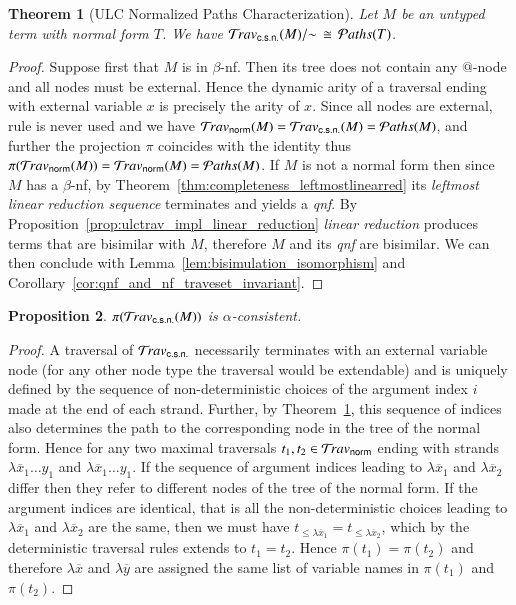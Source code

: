 \documentclass{elsarticle}
\theoremstyle{plain}
\newtheorem{theorem}{Theorem}[section]
\newtheorem{proposition}[theorem]{Proposition}
\theoremstyle{definition}
\newcommand{\normalizing}{{\sf norm}}
\newcommand{\travsetnorm}{\travset_\normalizing} %
\newcommand{\travsetscn}{\travset_{\sf c.s.n.}} %
\def\structisomorphic{\cong} %
\def\coresymbol{\pi} %
\newcommand{\core}[1]{\coresymbol(#1)} %
\newcommand\pathset{{\mathcal{P}aths}} %
\begin{document}
\begin{theorem}[ULC Normalized Paths Characterization]
\label{thm:path_charact_ulc}
Let $M$ be an untyped term with normal form $T$. We have
$\travsetscn(M)/{\sim} \, \structisomorphic\, \pathset(T)$.
\end{theorem}
\begin{proof}
Suppose first that $M$ is in $\beta$-nf. Then its tree does not contain any $@$-node and all nodes must be external.
Hence the dynamic arity of a traversal ending with external variable $x$ is precisely the arity of $x$. Since all nodes are external,
rule  is never used and we have
$\travsetnorm(M) = \travsetscn(M) = \pathset(M)$, and further
the projection $\coresymbol$ coincides with the identity thus $\core{\travsetnorm(M)} = \travsetnorm(M) = \pathset(M)$.
%
If $M$ is not a normal form then since $M$ has a $\beta$-nf, by Theorem~\ref{thm:completeness_leftmostlinearred} its \emph{leftmost linear reduction sequence} terminates and yields a \emph{qnf}.
By Proposition~\ref{prop:ulctrav_impl_linear_reduction}
\emph{linear reduction} produces terms that are bisimilar with $M$,
therefore $M$ and its \emph{qnf} are bisimilar.
We can then conclude with Lemma~\ref{lem:bisimulation_isomorphism}
and Corollary~\ref{cor:qnf_and_nf_traveset_invariant}.
\end{proof}

\begin{proposition}
    \label{prop:core_travsetnorm_alpha_consistent}
    $\core{\travsetscn(M)}$ is $\alpha$-consistent.
\end{proposition}
\begin{proof}
A traversal of $\travsetscn$
necessarily terminates with an external variable node (for any other node type the traversal would be extendable) and
is uniquely defined by the sequence of non-deterministic choices of the argument index $i$ made at the end of each strand. Further, by Theorem~\ref{thm:path_charact_ulc}, this sequence of indices also determines the path to the corresponding node in the tree of the normal form.
Hence for any two maximal traversals $t_1,t_2 \in \travsetnorm$
ending with strands $\lambda\overline{x}_1 \ldots y_1$ and
$\lambda\overline{x}_1 \ldots y_1$.
If the sequence of argument indices leading to $\lambda\overline{x}_1$ and $\lambda\overline{x}_2$ differ then they refer to different nodes of the tree of the normal form.
If the argument indices are identical, that is all the non-deterministic choices leading to $\lambda\overline{x}_1$ and $\lambda\overline{x}_2$ are the same, then we must have $t_{\leq \lambda\overline{x}_1} = t_{\leq \lambda\overline{x}_2}$, which by the deterministic
traversal rules extends to $t_1 = t_2$.
Hence $\core{t_1} = \core{t_2}$ and therefore $\lambda\overline{x}$
and $\lambda\overline{y}$ are assigned the same list of variable names in
$\core{t_1}$ and $\core{t_2}$.
\end{proof}
\end{document}
